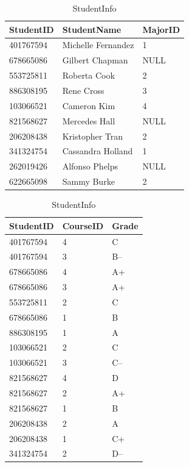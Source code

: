 \begin{table}[H]
\begin{subtable}{0.55\textwidth}
\begin{subtable}{\textwidth}
        \centering
        \footnotesize
        \begin{tabular}{|l|l|l|}
            \hline StudentID & StudentName & MajorID \\ \hline
            401767594 & Michelle Fernandez & 1 \\
            678665086 & Gilbert Chapman & NULL \\
            553725811 & Roberta Cook & 2 \\
            886308195 & Rene Cross & 3 \\
            103066521 & Cameron Kim & 4 \\
            821568627 & Mercedes Hall & NULL \\
            206208438 & Kristopher Tran & 2 \\
            341324754 & Cassandra Holland & 1 \\
            262019426 & Alfonso Phelps & NULL \\
            622665098 & Sammy Burke & 2 \\ \hline
        \end{tabular}
        \caption{StudentInfo}
        \label{table:sql2-student-info}
    \end{subtable}
\end{subtable}
\hfil
\begin{subtable}{.35\textwidth}
    \centering
    \footnotesize
    \begin{tabular}{|l|l|l|}
        \hline StudentID & CourseID & Grade \\ \hline
        401767594 & 4 & C \\
        401767594 & 3 & B-- \\
        678665086 & 4 & A+ \\
        678665086 & 3 & A+ \\
        553725811 & 2 & C \\
        678665086 & 1 & B \\
        886308195 & 1 & A \\
        103066521 & 2 & C \\
        103066521 & 3 & C-- \\
        821568627 & 4 & D \\
        821568627 & 2 & A+ \\
        821568627 & 1 & B \\
        206208438 & 2 & A \\
        206208438 & 1 & C+ \\
        341324754 & 2 & D-- \\

\end{tabular}
\end{subtable}
\end{table}
